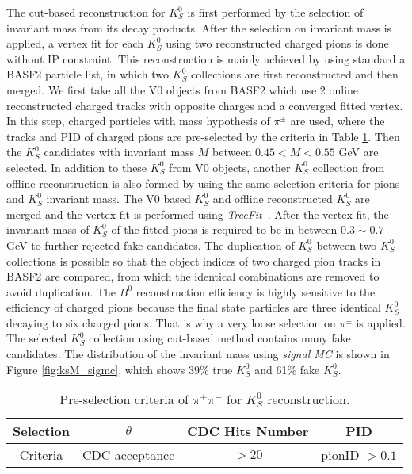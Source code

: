  The cut-based reconstruction for $K_S^0$ is first performed by the selection of invariant mass from its decay products. After the selection on invariant mass is applied, a vertex fit for each $K_S^0$ using two reconstructed charged pions is done without IP constraint. This reconstruction is mainly achieved by using standard a BASF2 particle list, in which two $K_S^0$ collections are first reconstructed and then merged. We first take all the V0 objects from BASF2 which use 2 online reconstructed charged tracks with opposite charges and a converged fitted vertex. In this step, charged particles with mass hypothesis of $\pi^{\pm}$ are used, where the tracks and PID of charged pions are pre-selected by the criteria in Table \ref{tab:kspipi_select}. Then the $K_S^0$ candidates with invariant mass $M$ between $0.45 < M < 0.55$ GeV are selected. In addition to these $K_S^0$ from V0 objects, another $K_S^0$ collection from offline reconstruction is also formed by using the same selection criteria for pions and $K_S^0$ invariant mass. The V0 based $K_S^0$ and offline reconstructed $K_S^0$ are merged and the vertex fit is performed using \textit{TreeFit}~\cite{krohn2020global}. After the vertex fit, the invariant mass of $K_S^0$ of the fitted pions is required to be in between $0.3\sim 0.7$ GeV to further rejected fake candidates. The duplication of $K_S^0$ between two $K_S^0$ collections is possible so that the object indices of two charged pion tracks in BASF2 are compared, from which the identical combinations are removed to avoid duplication. The $B^0$ reconstruction efficiency is highly sensitive to the efficiency of charged pions because the final state particles are three identical $K_S^0$ decaying to six charged pions. That is why a very loose selection on $\pi^{\pm}$ is applied. The selected $K_S^0$ collection using cut-based method contains many fake candidates. The distribution of the invariant mass using \textit{signal MC} is shown in Figure \ref{fig:ksM_sigmc}, which shows 39\% true $K_S^0$ and 61\% fake $K_S^0$.
\begin{table}[htbp]
	\centering
	\large
	\caption{Pre-selection criteria of $\pi^+ \pi^-$ for $K_S^0$ reconstruction.}
	\label{tab:kspipi_select}
	\begin{tabular}{c c c c }
		\toprule
		Selection & $\theta$ & CDC Hits Number & PID  \\
		\hline
		Criteria  & CDC acceptance &  $>20$ & pionID $> 0.1$\\
		\bottomrule
	\end{tabular}
\end{table}

